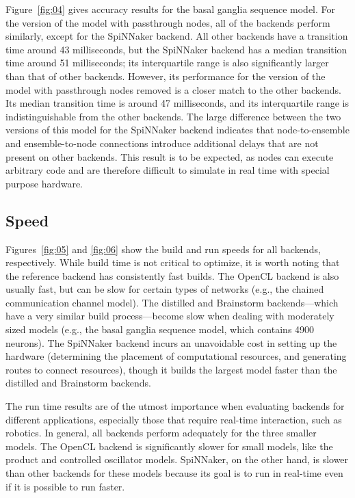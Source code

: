 \documentclass{frontiersSCNS}
\begin{document}
Figure~\ref{fig:04} gives accuracy results
for the basal ganglia sequence model.
For the version of the model with passthrough nodes,
all of the backends perform similarly,
except for the SpiNNaker backend.
All other backends have a transition time
around 43 milliseconds,
but the SpiNNaker backend has a median transition time
around 51 milliseconds;
its interquartile range
is also significantly larger
than that of other backends.
However, its performance for
the version of the model
with passthrough nodes removed
is a closer match to the other backends.
Its median transition time
is around 47 milliseconds,
and its interquartile range
is indistinguishable from the other backends.
The large difference between the two versions
of this model for the SpiNNaker backend
indicates that node-to-ensemble and
ensemble-to-node connections
introduce additional delays that are
not present on other backends.
This result is to be expected,
as nodes can execute arbitrary code
and are therefore difficult
to simulate in real time
with special purpose hardware.

\subsection{Speed}

Figures~\ref{fig:05} and \ref{fig:06} show
the build and run speeds for all backends, respectively.
While build time is not critical to optimize,
it is worth noting that the reference backend
has consistently fast builds.
The OpenCL backend is also usually fast,
but can be slow for certain types of networks
(e.g., the chained communication channel model).
The distilled and Brainstorm backends---which
have a very similar build process---become
slow when dealing with moderately sized models
(e.g., the basal ganglia sequence model,
which contains 4900 neurons).
The SpiNNaker backend incurs an unavoidable cost
in setting up the hardware
(determining the placement of computational resources,
and generating routes to connect resources),
though it builds the largest model faster than
the distilled and Brainstorm backends.

The run time results are of the utmost importance
when evaluating backends for different applications,
especially those that require real-time interaction,
such as robotics. In general, all backends
perform adequately for the three smaller models.
The OpenCL backend is significantly slower for small
models, like the product and controlled oscillator models.
SpiNNaker, on the other hand, is slower than other backends
for these models because its goal
is to run in real-time even if it is possible to run faster.
\end{document}
